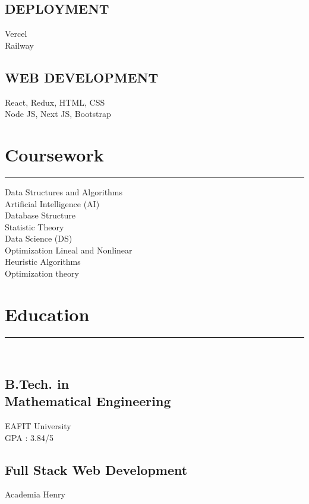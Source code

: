 \documentclass[]{rahulworld-resume}
\begin{document}
\begin{minipage}[t]{0.33\textwidth}
\subsection{DEPLOYMENT}
Vercel \\
Railway
\vspace{6pt}
\subsection{WEB DEVELOPMENT}
React, Redux, HTML, CSS \\
Node JS, Next JS, Bootstrap
\sectionsep
\section{Coursework}
\noindent\rule{5cm}{0.4pt}

Data Structures and Algorithms\\
Artificial Intelligence (AI)\\
Database Structure\\
Statistic Theory\\
Data Science (DS)\\
Optimization Lineal and Nonlinear\\
Heuristic Algorithms\\
Optimization theory
\sectionsep
\section{Education}
\noindent\rule{5cm}{0.4pt}\\
\subsection{B.Tech. in \\
Mathematical Engineering}
EAFIT University \\
GPA : 3.84/5\\

\subsection{Full Stack Web Development}
Academia Henry

%
%

\end{minipage}
\end{document}
